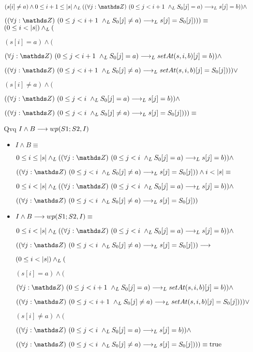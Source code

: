 \documentclass{article}
\begin{document}
\begin{itemize}
    $ (s[i] \neq a) \wedge 0 \leq i+1 \leq \longitud{s} \yLuego (\paraTodo{j}{(0}{i+1} \yLuego S_{0}[j] = a) \implicaLuego s[j] = b)) \wedge $

    $ (\paraTodo{j}{(0}{i+1} \yLuego S_{0}[j] \neq a) \implicaLuego s[j] = S_{0}[j])) ) \equiv$ \\

    $ (0 \leq i < |s|) \land _L ( $

    $(s[i] = a) \wedge ( $

    $\paraTodo{j}{(0}{i+1} \yLuego S_{0}[j] = a) \implicaLuego setAt(s,i,b)[j] = b)) \wedge $

    $ (\paraTodo{j}{(0}{i+1} \yLuego S_{0}[j] \neq a) \implicaLuego setAt(s,i,b)[j] = S_{0}[j]))) \vee $

    $ (s[i] \neq a) \wedge ($

    $ (\paraTodo{j}{(0}{i} \yLuego S_{0}[j] = a) \implicaLuego s[j] = b)) \wedge $

    $ (\paraTodo{j}{(0}{i} \yLuego S_{0}[j] \neq a) \implicaLuego s[j] = S_{0}[j])) ) \equiv$ \\

\end{itemize}

Qvq $I \wedge B \longrightarrow wp(S1;S2, I)$

\begin{itemize}
    \item $I \wedge B \equiv$

    $ 0 \leq i \leq \longitud{s} \yLuego (\paraTodo{j}{(0}{i} \yLuego S_{0}[j] = a) \implicaLuego s[j] = b)) \wedge $

    $ (\paraTodo{j}{(0}{i} \yLuego S_{0}[j] \neq a) \implicaLuego s[j] = S_{0}[j])) \wedge i < \longitud{s} \equiv$

    $ 0 \leq i < \longitud{s} \yLuego (\paraTodo{j}{(0}{i} \yLuego S_{0}[j] = a) \implicaLuego s[j] = b)) \wedge $

    $ (\paraTodo{j}{(0}{i} \yLuego S_{0}[j] \neq a) \implicaLuego s[j] = S_{0}[j]))$

    \item $I \wedge B \longrightarrow wp(S1;S2, I) \equiv$

    $ 0 \leq i < \longitud{s} \yLuego (\paraTodo{j}{(0}{i} \yLuego S_{0}[j] = a) \implicaLuego s[j] = b)) \wedge $

    $ (\paraTodo{j}{(0}{i} \yLuego S_{0}[j] \neq a) \implicaLuego s[j] = S_{0}[j])) \implica$

    $ (0 \leq i < |s|) \land _L ( $

    $(s[i] = a) \wedge ( $

    $\paraTodo{j}{(0}{i+1} \yLuego S_{0}[j] = a) \implicaLuego setAt(s,i,b)[j] = b)) \wedge $

    $ (\paraTodo{j}{(0}{i+1} \yLuego S_{0}[j] \neq a) \implicaLuego setAt(s,i,b)[j] = S_{0}[j]))) \vee $

    $ (s[i] \neq a) \wedge ($

    $ (\paraTodo{j}{(0}{i} \yLuego S_{0}[j] = a) \implicaLuego s[j] = b)) \wedge $

    $ (\paraTodo{j}{(0}{i} \yLuego S_{0}[j] \neq a) \implicaLuego s[j] = S_{0}[j]))) \equiv \True$
\end{itemize}
\end{document}
